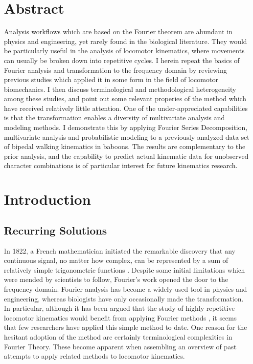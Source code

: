 \clearpage
\section{Abstract}
\label{sec:orgc3d91ac}
Analysis workflows which are based on the Fourier theorem are abundant in physics and engineering, yet rarely found in the biological literature.
They would be particularly useful in the analysis of locomotor kinematics, where movements can usually be broken down into repetitive cycles.
I herein repeat the basics of Fourier analysis and transformation to the frequency domain by reviewing previous studies which applied it in some form in the field of locomotor biomechanics.
I then discuss terminological and methodological heterogeneity among these studies, and point out some relevant properies of the method which have received relatively little attention.
One of the under-appreciated capabilities is that the transformation enables a diversity of multivariate analysis and modeling methods.
I demonstrate this by applying Fourier Series Decomposition, multivariate analysis and probabilistic modeling to a previously analyzed data set of bipedal walking kinematics in baboons.
The results are complementary to the prior analysis, and the capability to predict actual kinematic data for unobserved character combinations is of particular interest for future kinematics research.


\FloatBarrier\clearpage
\section{Introduction}
\label{intro12}

\subsection{Recurring Solutions}
\label{sec:orgdd8d8d1}
In 1822, a French mathematician initiated the remarkable discovery that any continuous signal, no matter how complex, can be represented by a sum of relatively simple trigonometric functions \citep{Fourier1822}.
Despite some initial limitations which were mended by scientists to follow, Fourier's work opened the door to the frequency domain.
Fourier analysis has become a widely-used tool in physics and engineering, whereas biologists have only occasionally made the transformation.
In particular, although it has been argued that the study of highly repetitive locomotor kinematics would benefit from applying Fourier methods \citep{Schneider1983,Pike2002,Skejo2021,Webb2007,Mielke2019}, it seems that few researchers have applied this simple method to date.
One reason for the hesitant adoption of the method are certainly terminological complexities in Fourier Theory.
These become apparent when assembling an overview of past attempts to apply related methods to locomotor kinematics.


